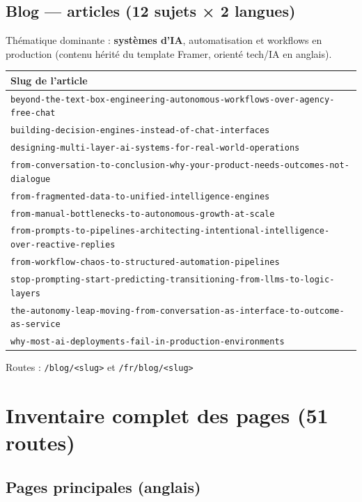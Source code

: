 \documentclass[11pt,a4paper]{report}
\begin{document}
\section{Blog — articles (12 sujets × 2 langues)}

Thématique dominante : \textbf{systèmes d'IA}, automatisation et workflows en production (contenu hérité du template Framer, orienté tech/IA en anglais).

\begin{longtable}{@{}p{10.5cm}@{}}
\toprule
\textbf{Slug de l'article} \\
\midrule
\endhead
\texttt{beyond-the-text-box-engineering-autonomous-workflows-over-agency-free-chat} \\
\texttt{building-decision-engines-instead-of-chat-interfaces} \\
\texttt{designing-multi-layer-ai-systems-for-real-world-operations} \\
\texttt{from-conversation-to-conclusion-why-your-product-needs-outcomes-not-dialogue} \\
\texttt{from-fragmented-data-to-unified-intelligence-engines} \\
\texttt{from-manual-bottlenecks-to-autonomous-growth-at-scale} \\
\texttt{from-prompts-to-pipelines-architecting-intentional-intelligence-over-reactive-replies} \\
\texttt{from-workflow-chaos-to-structured-automation-pipelines} \\
\texttt{stop-prompting-start-predicting-transitioning-from-llms-to-logic-layers} \\
\texttt{the-autonomy-leap-moving-from-conversation-as-interface-to-outcome-as-service} \\
\texttt{why-most-ai-deployments-fail-in-production-environments} \\
\bottomrule
\end{longtable}

Routes : \texttt{/blog/<slug>} et \texttt{/fr/blog/<slug>}

\chapter{Inventaire complet des pages (51 routes)}

\section{Pages principales (anglais)}
\end{document}
